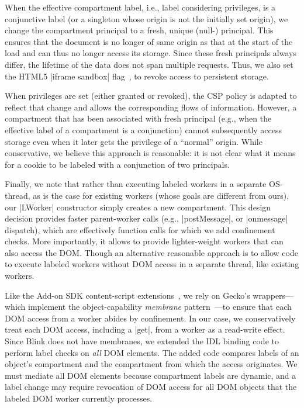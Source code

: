 When the effective compartment label, i.e., label considering
privileges, is a conjunctive label (or a singleton whose origin is not
the initially set origin), we change the compartment principal to a
fresh, unique (null-) principal. 
%
This ensures that the document is no longer of same origin as that
at the start of the load and can thus no longer access its storage.
%
Since these fresh principals always differ, the lifetime of the data does not
span multiple requests.
%
Thus, we also set the HTML5 \js|iframe sandbox| flag~\cite{html5},
to revoke access to persistent storage.


When privileges are set (either granted or revoked), the CSP policy is
adapted to reflect that change and allows the corresponding flows of
information. However, a compartment that has been associated with
fresh principal (e.g., when the effective label of a compartment is a
conjunction) cannot subsequently access storage even when it later
gets the privilege of a ``normal'' origin. While conservative, we
believe this approach is reasonable: it is not clear what it means for
a cookie to be labeled with a conjunction of two principals.

%

Finally, we note that rather than executing labeled workers in a
separate OS-thread, as is the case for existing workers (whose goals
are different from ours), our \js|LWorker| constructor simply creates a new
compartment. This design decision provides 
%
faster parent-worker calls (e.g.,
\js|postMessage|, or \js|onmessage| dispatch), which are effectively function
calls for which we add confinement checks. 
%
More importantly, it allows \sys{} to provide lighter-weight workers
that can also access the DOM.
%
Though an alternative reasonable approach is to allow code to execute
labeled workers without DOM access in a separate thread, like existing
workers.
 
Like the Add-on SDK content-script extensions~\cite{addon-sdk}, we
rely on Gecko's wrappers---which implement the object-capability
\emph{membrane}
pattern~\cite{miller2003paradigm,miller2006robust}---to ensure that
each DOM access from a worker abides by confinement.
%
In our case, we conservatively treat each DOM access, including a
\js|get|, from a worker as a read-write effect.
%
Since Blink does not have membranes, we extended the IDL binding code
to perform label checks on \emph{all} DOM elements.
%
The added code compares labels of an object's compartment and the compartment
from which the access originates.
%
We must mediate all DOM elements because compartment labels are dynamic, and a
label change may require revocation of DOM access for all DOM objects that the
labeled DOM worker currently processes.



